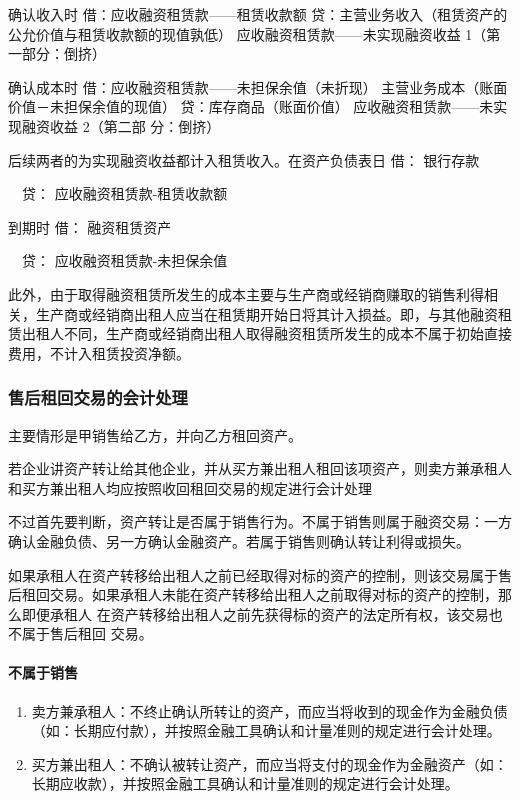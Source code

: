 \documentclass[UTF8,12pt]{ctexart}
\newenvironment{Dr}{\noindent 借：}{\par}
\newenvironment{Cr}{\noindent \ \ 贷：}{\par}
\numberwithin{equation}{section} %
\numberwithin{figure}{section}
\numberwithin{table}{section}
\begin{document}
	确认收入时
	借：应收融资租赁款——租赁收款额
	贷：主营业务收入（租赁资产的公允价值与租赁收款额的现值孰低）
	应收融资租赁款——未实现融资收益
	1（第一部分：倒挤）
	
	确认成本时
	借：应收融资租赁款——未担保余值（未折现）
	主营业务成本（账面价值－未担保余值的现值） 贷：库存商品（账面价值）
	应收融资租赁款——未实现融资收益 2（第二部
	分：倒挤）
	
	后续两者的为实现融资收益都计入租赁收入。在资产负债表日
	\begin{Dr}
		银行存款
	\end{Dr}
	\begin{Cr}
		应收融资租赁款-租赁收款额
	\end{Cr}

	到期时
	\begin{Dr}
		融资租赁资产
	\end{Dr}
	\begin{Cr}
		应收融资租赁款-未担保余值
	\end{Cr}
	
	此外，由于取得融资租赁所发生的成本主要与生产商或经销商赚取的销售利得相关，生产商或经销商出租人应当在租赁期开始日将其计入损益。即，与其他融资租赁出租人不同，生产商或经销商出租人取得融资租赁所发生的成本不属于初始直接费用，不计入租赁投资净额。
	
	\subsubsection{售后租回交易的会计处理}
	主要情形是甲销售给乙方，并向乙方租回资产。
	
	若企业讲资产转让给其他企业，并从买方兼出租人租回该项资产，则卖方兼承租人和买方兼出租人均应按照收回租回交易的规定进行会计处理
	
	不过首先要判断，资产转让是否属于销售行为。不属于销售则属于融资交易：一方确认金融负债、另一方确认金融资产。若属于销售则确认转让利得或损失。
	
	如果承租人在资产转移给出租人之前已经取得对标的资产的控制，则该交易属于售后租回交易。如果承租人未能在资产转移给出租人之前取得对标的资产的控制，那么即便承租人
	在资产转移给出租人之前先获得标的资产的法定所有权，该交易也不属于售后租回  交易。
	
	\paragraph{不属于销售}
	\begin{enumerate}
		\item 卖方兼承租人：不终止确认所转让的资产，而应当将收到的现金作为金融负债（如：长期应付款），并按照金融工具确认和计量准则的规定进行会计处理。
	
		\item 买方兼出租人：不确认被转让资产，而应当将支付的现金作为金融资产（如：长期应收款），并按照金融工具确认和计量准则的规定进行会计处理。
	\end{enumerate}
	
\end{document}
